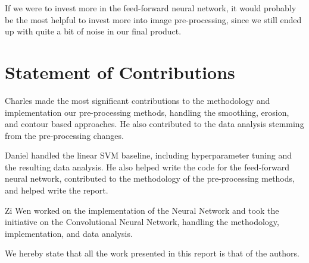 \documentclass[conference]{IEEEtran}
\begin{document}
If we were to invest more in the feed-forward neural network, it would probably be the most helpful to invest more into image pre-processing, since we still ended up with quite a bit of noise in our final product.

\section{\textbf{Statement of Contributions}}

Charles made the most significant contributions to the methodology and implementation our pre-processing methods, handling the smoothing, erosion, and contour based approaches. He also contributed to the data analysis stemming from the pre-processing changes.

Daniel handled the linear SVM baseline, including hyperparameter tuning and the resulting data analysis. He also helped write the code for the feed-forward neural network, contributed to the methodology of the pre-processing methods, and helped write the report.

Zi Wen worked on the implementation of the Neural Network and took the initiative on the Convolutional Neural Network, handling the methodology, implementation, and data analysis.

We hereby state that all the work presented in this report is that of the authors. 
\end{document}
